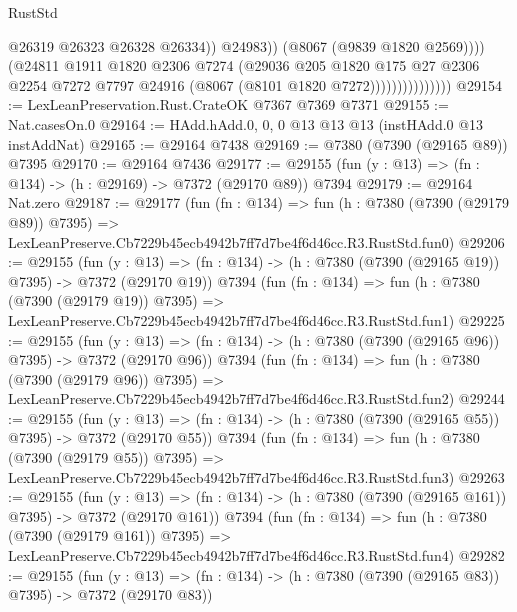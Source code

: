 \begin{lexlean}{RustStd}
\begin{coremodule}
                                      @26319
                                      @26323
                                      @26328
                                      @26334))
                                  @24983))
                              (@8067 (@9839 @1820 @2569))))
                          (@24811
                            @1911
                            @1820
                            @2306
                            @7274
                            (@29036
                              @205
                              @1820
                              @175
                              @27
                              @2306
                              @2254
                              @7272
                              @7797
                              @24916
                              (@8067 (@8101 @1820 @7272)))))))))))))))
@29154 := LexLeanPreservation.Rust.CrateOK @7367 @7369 @7371
@29155 := Nat.casesOn.{0}
@29164 := HAdd.hAdd.{0, 0, 0} @13 @13 @13 (instHAdd.{0} @13 instAddNat)
@29165 := @29164 @7438
@29169 := @7380 (@7390 (@29165 @89)) @7395
@29170 := @29164 @7436
@29177 := @29155 (fun (y : @13) => (fn : @134) -> (h : @29169) -> @7372 (@29170 @89)) @7394
@29179 := @29164 Nat.zero
@29187 := @29177
    (fun (fn : @134) =>
    fun (h : @7380 (@7390 (@29179 @89)) @7395) =>
    LexLeanPreserve.Cb7229b45ecb4942b7ff7d7be4f6d46cc.R3.RustStd.fun0)
@29206 := @29155
    (fun (y : @13) => (fn : @134) -> (h : @7380 (@7390 (@29165 @19)) @7395) -> @7372 (@29170 @19))
    @7394
    (fun (fn : @134) =>
    fun (h : @7380 (@7390 (@29179 @19)) @7395) =>
    LexLeanPreserve.Cb7229b45ecb4942b7ff7d7be4f6d46cc.R3.RustStd.fun1)
@29225 := @29155
    (fun (y : @13) => (fn : @134) -> (h : @7380 (@7390 (@29165 @96)) @7395) -> @7372 (@29170 @96))
    @7394
    (fun (fn : @134) =>
    fun (h : @7380 (@7390 (@29179 @96)) @7395) =>
    LexLeanPreserve.Cb7229b45ecb4942b7ff7d7be4f6d46cc.R3.RustStd.fun2)
@29244 := @29155
    (fun (y : @13) => (fn : @134) -> (h : @7380 (@7390 (@29165 @55)) @7395) -> @7372 (@29170 @55))
    @7394
    (fun (fn : @134) =>
    fun (h : @7380 (@7390 (@29179 @55)) @7395) =>
    LexLeanPreserve.Cb7229b45ecb4942b7ff7d7be4f6d46cc.R3.RustStd.fun3)
@29263 := @29155
    (fun (y : @13) => (fn : @134) -> (h : @7380 (@7390 (@29165 @161)) @7395) -> @7372 (@29170 @161))
    @7394
    (fun (fn : @134) =>
    fun (h : @7380 (@7390 (@29179 @161)) @7395) =>
    LexLeanPreserve.Cb7229b45ecb4942b7ff7d7be4f6d46cc.R3.RustStd.fun4)
@29282 := @29155
    (fun (y : @13) => (fn : @134) -> (h : @7380 (@7390 (@29165 @83)) @7395) -> @7372 (@29170 @83))

\end{coremodule}
\end{lexlean}
